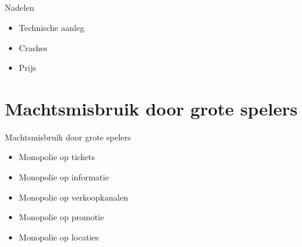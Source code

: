 \documentclass{beamer}
\begin{document}
    \subsection{}
    \begin{frame}{Nadelen}
        \begin{itemize}
            \item Technische aanleg
            \item Crashes
            \item Prijs
            \end{itemize}
    \end{frame}
    
    
    
    
    
    
\section[Machtsmisbruik]{Machtsmisbruik door grote spelers}
\begin{frame}{Machtsmisbruik door grote spelers}
    \begin{itemize}
        \item Monopolie op tickets
        \item Monopolie op informatie
        \item Monopolie op verkoopkanalen
        \item Monopolie op promotie
        \item Monopolie op locaties
    \end{itemize}
\end{frame}
    
\end{document}
